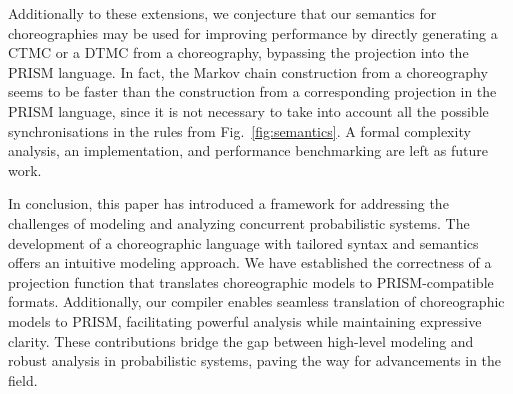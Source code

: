 Additionally to these extensions, we conjecture that our semantics for
choreographies may be used for improving performance by directly
generating a CTMC or a DTMC from a choreography, bypassing the
projection into the PRISM language. In fact, the Markov chain
construction from a choreography seems to be faster than the
construction from a corresponding projection in the PRISM language,
since it is not necessary to take into account all the possible
synchronisations in the rules from Fig.~\ref{fig:semantics}. A formal
complexity analysis, an implementation, and performance benchmarking
are left as future work.



In conclusion, this paper has introduced a framework for addressing
the challenges of modeling and analyzing concurrent probabilistic
systems.
The development of a choreographic language with tailored syntax and
semantics offers an intuitive modeling approach. We have established
the correctness of a projection function that translates choreographic
models to PRISM-compatible formats. Additionally, our compiler enables
seamless translation of choreographic models to PRISM, facilitating
powerful analysis while maintaining expressive clarity. These
contributions bridge the gap between high-level modeling and robust
analysis in probabilistic systems, paving the way for advancements in
the field. 

